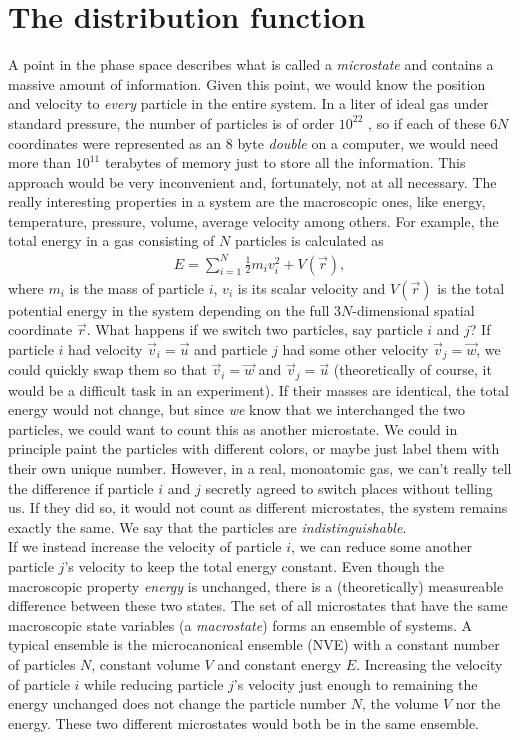 \section{The distribution function}
\label{sec:kinetic_theory_distribution_function}
A point in the phase space describes what is called a \textit{microstate} and contains a massive amount of information. Given this point, we would know the position and velocity to \textit{every} particle in the entire system. In a liter of ideal gas under standard pressure, the number of particles is of order $10^{22}$ \cite{garcia2000numerical}, so if each of these $6N$ coordinates were represented as an 8 byte \textit{double} on a computer, we would need more than $10^{11}$ terabytes of memory just to store all the information. This approach would be very inconvenient and, fortunately, not at all necessary. The really interesting properties in a system are the macroscopic ones, like energy, temperature, pressure, volume, average velocity among others. For example, the total energy in a gas consisting of $N$ particles is calculated as
\begin{align*}
	E = \sum_{i=1}^N \frac{1}{2} m_i v_i^2 + V(\vec r),
\end{align*}
where $m_i$ is the mass of particle $i$, $v_i$ is its scalar velocity and $V(\vec r)$ is the total potential energy in the system depending on the full $3N$-dimensional spatial coordinate $\vec r$. What happens if we switch two particles, say particle $i$ and $j$? If particle $i$ had velocity $\vec v_i = \vec u$ and particle $j$ had some other velocity $\vec v_j = \vec w$, we could quickly swap them so that $\vec v_i = \vec w$ and $\vec v_j = \vec u$ (theoretically of course, it would be a difficult task in an experiment). If their masses are identical, the total energy would not change, but since \textit{we} know that we interchanged the two particles, we could want to count this as another microstate. We could in principle paint the particles with different colors, or maybe just label them with their own unique number. However, in a real, monoatomic gas, we can't really tell the difference if particle $i$ and $j$ secretly agreed to switch places without telling us. If they did so, it would not count as different microstates, the system remains exactly the same. We say that the particles are \textit{indistinguishable}.\\
If we instead increase the velocity of particle $i$, we can reduce some another particle $j$'s velocity to keep the total energy constant. Even though the macroscopic property \textit{energy} is unchanged, there is a (theoretically) measureable difference between these two states. The set of all microstates that have the same macroscopic state variables (a \textit{macrostate}) forms an ensemble of systems. A typical ensemble is the microcanonical ensemble (NVE) with a constant number of particles $N$, constant volume $V$ and constant energy $E$. Increasing the velocity of particle $i$ while reducing particle $j$'s velocity just enough to remaining the energy unchanged does not change the particle number $N$, the volume $V$ nor the energy. These two different microstates would both be in the same ensemble.\\
